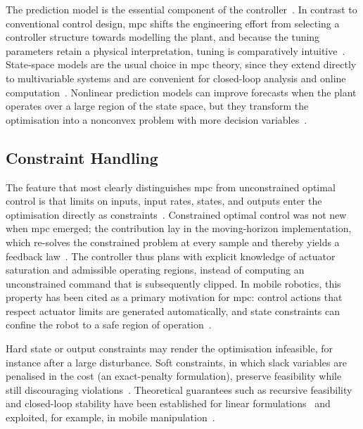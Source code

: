 The prediction model is the essential component of the controller~\cite{rawlings2000}. In contrast to conventional control design, \ac{mpc} shifts the engineering effort from selecting a controller structure towards modelling the plant, and because the tuning parameters retain a physical interpretation, tuning is comparatively intuitive~\cite{schwenzer2021}. State-space models are the usual choice in \ac{mpc} theory, since they extend directly to multivariable systems and are convenient for closed-loop analysis and online computation~\cite{rawlings2000}. Nonlinear prediction models can improve forecasts when the plant operates over a large region of the state space, but they transform the optimisation into a nonconvex problem with more decision variables~\cite{rawlings2000,kuhne2004}.

\subsection{Constraint Handling}\label{sec:bg-mpc-constraints}

The feature that most clearly distinguishes \ac{mpc} from unconstrained optimal control is that limits on inputs, input rates, states, and outputs enter the optimisation directly as constraints~\cite{rawlings2000,bemporad1999}. Constrained optimal control was not new when \ac{mpc} emerged; the contribution lay in the moving-horizon implementation, which re-solves the constrained problem at every sample and thereby yields a feedback law~\cite{rawlings2000}. The controller thus plans with explicit knowledge of actuator saturation and admissible operating regions, instead of computing an unconstrained command that is subsequently clipped. In mobile robotics, this property has been cited as a primary motivation for \ac{mpc}: control actions that respect actuator limits are generated automatically, and state constraints can confine the robot to a safe region of operation~\cite{kuhne2005}.

Hard state or output constraints may render the optimisation infeasible, for instance after a large disturbance. Soft constraints, in which slack variables are penalised in the cost (an exact-penalty formulation), preserve feasibility while still discouraging violations~\cite{rawlings2000,schwenzer2021}. Theoretical guarantees such as recursive feasibility and closed-loop stability have been established for linear formulations~\cite{schwenzer2021} and exploited, for example, in mobile manipulation~\cite{buizza2018}.

